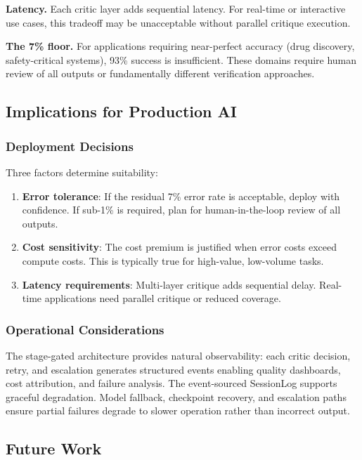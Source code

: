 \documentclass[sigconf]{acmart}
\begin{document}
\textbf{Latency.} Each critic layer adds sequential latency. For real-time or interactive use cases, this tradeoff may be unacceptable without parallel critique execution.

\textbf{The 7\% floor.} For applications requiring near-perfect accuracy (drug discovery, safety-critical systems), 93\% success is insufficient. These domains require human review of all outputs or fundamentally different verification approaches.

\subsection{Implications for Production AI}

\subsubsection{Deployment Decisions}

Three factors determine suitability:

\begin{enumerate}
  \item \textbf{Error tolerance}: If the residual 7\% error rate is acceptable, deploy with confidence. If sub-1\% is required, plan for human-in-the-loop review of all outputs.
  \item \textbf{Cost sensitivity}: The cost premium is justified when error costs exceed compute costs. This is typically true for high-value, low-volume tasks.
  \item \textbf{Latency requirements}: Multi-layer critique adds sequential delay. Real-time applications need parallel critique or reduced coverage.
\end{enumerate}

\subsubsection{Operational Considerations}

The stage-gated architecture provides natural observability: each critic decision, retry, and escalation generates structured events enabling quality dashboards, cost attribution, and failure analysis. The event-sourced SessionLog supports graceful degradation. Model fallback, checkpoint recovery, and escalation paths ensure partial failures degrade to slower operation rather than incorrect output.

\subsection{Future Work}
\end{document}
